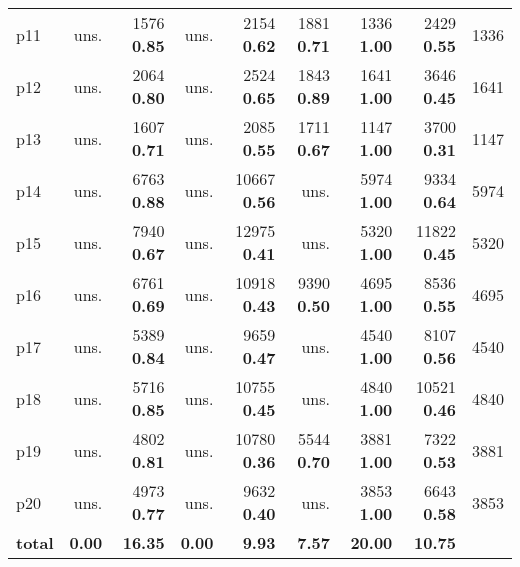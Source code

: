 \begin{tabular}{|l|rrrrrrr|r|}
p11 & uns. & {\footnotesize 1576} \textbf{0.85} & uns. & {\footnotesize 2154} \textbf{0.62} & {\footnotesize 1881} \textbf{0.71} & {\footnotesize 1336} \textbf{1.00} & {\footnotesize 2429} \textbf{0.55} & 1336\\
p12 & uns. & {\footnotesize 2064} \textbf{0.80} & uns. & {\footnotesize 2524} \textbf{0.65} & {\footnotesize 1843} \textbf{0.89} & {\footnotesize 1641} \textbf{1.00} & {\footnotesize 3646} \textbf{0.45} & 1641\\
p13 & uns. & {\footnotesize 1607} \textbf{0.71} & uns. & {\footnotesize 2085} \textbf{0.55} & {\footnotesize 1711} \textbf{0.67} & {\footnotesize 1147} \textbf{1.00} & {\footnotesize 3700} \textbf{0.31} & 1147\\
p14 & uns. & {\footnotesize 6763} \textbf{0.88} & uns. & {\footnotesize 10667} \textbf{0.56} & uns. & {\footnotesize 5974} \textbf{1.00} & {\footnotesize 9334} \textbf{0.64} & 5974\\
p15 & uns. & {\footnotesize 7940} \textbf{0.67} & uns. & {\footnotesize 12975} \textbf{0.41} & uns. & {\footnotesize 5320} \textbf{1.00} & {\footnotesize 11822} \textbf{0.45} & 5320\\
p16 & uns. & {\footnotesize 6761} \textbf{0.69} & uns. & {\footnotesize 10918} \textbf{0.43} & {\footnotesize 9390} \textbf{0.50} & {\footnotesize 4695} \textbf{1.00} & {\footnotesize 8536} \textbf{0.55} & 4695\\
p17 & uns. & {\footnotesize 5389} \textbf{0.84} & uns. & {\footnotesize 9659} \textbf{0.47} & uns. & {\footnotesize 4540} \textbf{1.00} & {\footnotesize 8107} \textbf{0.56} & 4540\\
p18 & uns. & {\footnotesize 5716} \textbf{0.85} & uns. & {\footnotesize 10755} \textbf{0.45} & uns. & {\footnotesize 4840} \textbf{1.00} & {\footnotesize 10521} \textbf{0.46} & 4840\\
p19 & uns. & {\footnotesize 4802} \textbf{0.81} & uns. & {\footnotesize 10780} \textbf{0.36} & {\footnotesize 5544} \textbf{0.70} & {\footnotesize 3881} \textbf{1.00} & {\footnotesize 7322} \textbf{0.53} & 3881\\
p20 & uns. & {\footnotesize 4973} \textbf{0.77} & uns. & {\footnotesize 9632} \textbf{0.40} & uns. & {\footnotesize 3853} \textbf{1.00} & {\footnotesize 6643} \textbf{0.58} & 3853\\
\hline
\textbf{total} & \textbf{0.00} & \textbf{16.35} & \textbf{0.00} & \textbf{9.93} & \textbf{7.57} & \textbf{20.00} & \textbf{10.75} & \\
\hline
\end{tabular}

